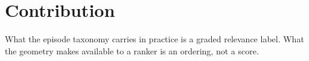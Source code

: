 \section{Contribution}

What the episode taxonomy carries in practice is a graded relevance label.
What the geometry makes available to a ranker is an ordering, not a score.
